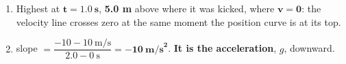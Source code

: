 \documentclass[12pt, twoside]{article}
\begin{document}
\begin{enumerate}[itemsep=0.5cm]
\begin{enumerate}[itemsep=0.3cm]
      \emph{The position curve must be smooth and rounded at the top, not a point
      made of two straight segments.}
    \item Highest at $\mathbf{t = 1.0~\textbf{s}}$, \textbf{5.0 m} above where it
      was kicked, where $\mathbf{v = 0}$: the velocity line crosses zero at the same
      moment the position curve is at its top.
    \item slope $= \dfrac{-10 - 10~\text{m/s}}{2.0 - 0~\text{s}} =
      \mathbf{-10~\textbf{m/s}^\mathbf{2}}$. \textbf{It is the acceleration}, $g$,
      downward.
  \end{enumerate}

\end{enumerate}
\end{document}
